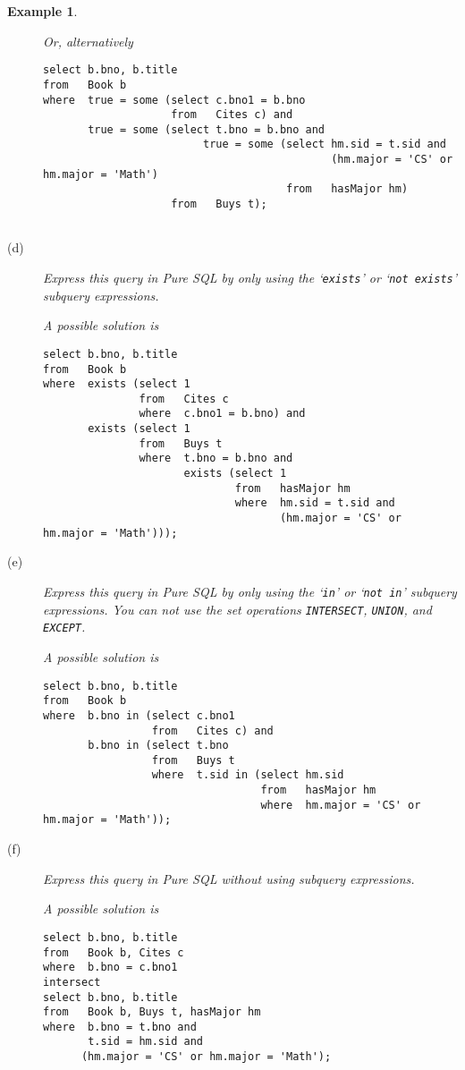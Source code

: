 \documentclass[11pt]{article}
\newtheorem{example}{Example}
\begin{document}
\begin{example}
\begin{description}
Or, alternatively
{\footnotesize
\begin{verbatim}
select b.bno, b.title
from   Book b
where  true = some (select c.bno1 = b.bno
                    from   Cites c) and
       true = some (select t.bno = b.bno and 
                         true = some (select hm.sid = t.sid and 
                                             (hm.major = 'CS' or hm.major = 'Math')
                                      from   hasMajor hm)
                    from   Buys t);
                    
\end{verbatim}
}


\item[(d)] Express this query in Pure SQL by only using the `{\tt exists}' or `{\tt not exists}' subquery expressions.

A possible solution is 
{\footnotesize
\begin{verbatim}
select b.bno, b.title
from   Book b
where  exists (select 1
               from   Cites c
               where  c.bno1 = b.bno) and 
       exists (select 1
               from   Buys t
               where  t.bno = b.bno and
                      exists (select 1
                              from   hasMajor hm
                              where  hm.sid = t.sid and 
                                     (hm.major = 'CS' or hm.major = 'Math')));
\end{verbatim}
}

\item[(e)]   Express this query in Pure SQL by only using the `{\tt in}' or `{\tt not in}' subquery expressions.
You can not use the set operations {\tt INTERSECT}, {\tt UNION}, and {\tt EXCEPT}.

A possible solution is
{\footnotesize
\begin{verbatim}
select b.bno, b.title
from   Book b
where  b.bno in (select c.bno1
                 from   Cites c) and
       b.bno in (select t.bno
                 from   Buys t
                 where  t.sid in (select hm.sid 
                                  from   hasMajor hm
                                  where  hm.major = 'CS' or hm.major = 'Math'));
\end{verbatim}
}


\item[(f)]   Express this query in Pure SQL without using subquery expressions. 

A possible solution is
{\footnotesize
\begin{verbatim}
select b.bno, b.title
from   Book b, Cites c
where  b.bno = c.bno1
intersect
select b.bno, b.title
from   Book b, Buys t, hasMajor hm
where  b.bno = t.bno and
       t.sid = hm.sid and
      (hm.major = 'CS' or hm.major = 'Math');
\end{verbatim}}

\end{description}
\end{example}
\end{document}
